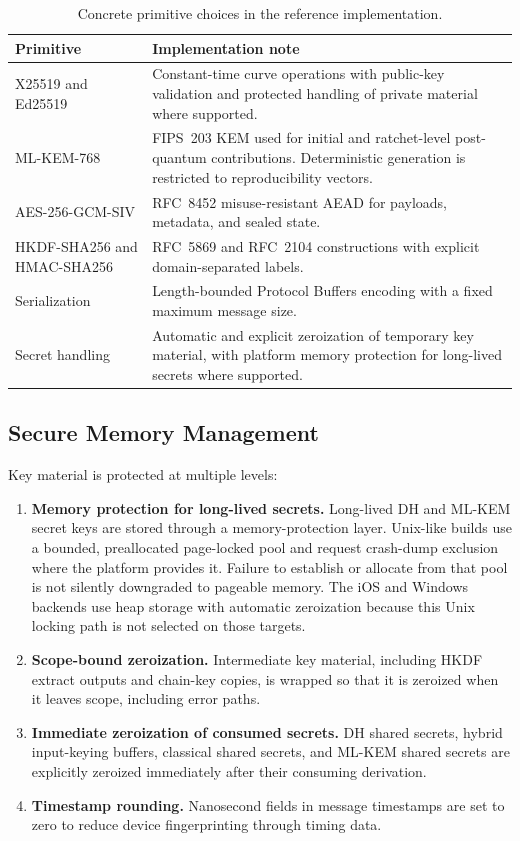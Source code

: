 \documentclass[preprint,12pt]{elsarticle}
\theoremstyle{definition}
\begin{document}
\begin{table}[H]
\centering
\caption{Concrete primitive choices in the reference implementation.}\label{tab:deps}
\small
\begin{tabularx}{\textwidth}{@{}p{}Y@{}}
\toprule
Primitive & Implementation note \\
\midrule
X25519 and Ed25519 & Constant-time curve operations with public-key validation and protected handling of private material where supported. \\
ML-KEM-768 & FIPS~203 KEM used for initial and ratchet-level post-quantum contributions. Deterministic generation is restricted to reproducibility vectors. \\
AES-256-GCM-SIV & RFC~8452 misuse-resistant AEAD for payloads, metadata, and sealed state. \\
HKDF-SHA256 and HMAC-SHA256 & RFC~5869 and RFC~2104 constructions with explicit domain-separated labels. \\
Serialization & Length-bounded Protocol Buffers encoding with a fixed maximum message size. \\
Secret handling & Automatic and explicit zeroization of temporary key material, with platform memory protection for long-lived secrets where supported. \\
\bottomrule
\end{tabularx}
\end{table}

\subsection{Secure Memory Management}

Key material is protected at multiple levels:

\begin{enumerate}
  \item \textbf{Memory protection for long-lived secrets.} Long-lived DH and ML-KEM secret keys
  are stored through a memory-protection layer. Unix-like builds use a bounded,
  preallocated page-locked pool and request crash-dump exclusion where the
  platform provides it. Failure to establish or allocate from that pool is not
  silently downgraded to pageable memory. The iOS and Windows backends use
  heap storage with automatic zeroization because this Unix locking path is not
  selected on those targets.

  \item \textbf{Scope-bound zeroization.} Intermediate key material, including HKDF
  extract outputs and chain-key copies, is wrapped so that it is zeroized when it
  leaves scope, including error paths.

  \item \textbf{Immediate zeroization of consumed secrets.} DH shared secrets, hybrid input-keying
  buffers, classical shared secrets, and ML-KEM shared secrets are explicitly
  zeroized immediately after their consuming derivation.

  \item \textbf{Timestamp rounding.} Nanosecond fields in message timestamps are set to zero to reduce device fingerprinting through timing data.
\end{enumerate}
\end{document}
